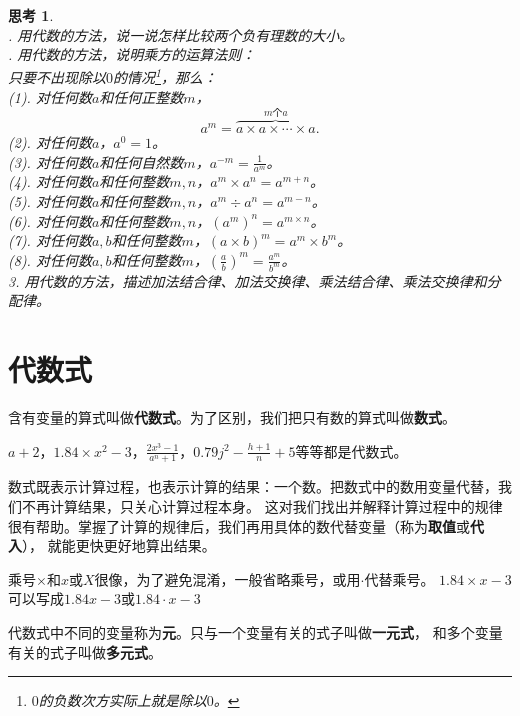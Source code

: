 \documentclass[12pt,UTF8]{ctexbook}
\newtheorem{sk}{思考}[section]
\begin{document}
\begin{sk}\label{sk:1-0-0}
    \mbox{}\\
    . 用代数的方法，说一说怎样比较两个负有理数的大小。\\
    . 用代数的方法，说明乘方的运算法则：\\
    \indent \indent 只要不出现除以$0$的情况\footnote{$0$的负数次方实际上就是除以$0$。}，那么：\\
    \indent \indent (1). 对任何数$a$和任何正整数$m$，
    $$a^m = \overbrace{a\times a \times \cdots \times a}^{m\text{个}a}.$$
    \indent \indent (2). 对任何数$a$，$a^0 = 1$。\\
    \indent \indent (3). 对任何数$a$和任何自然数$m$，$a^{-m} = \frac{1}{a^m}$。\\
    \indent \indent (4). 对任何数$a$和任何整数$m,n$，$a^m \times a^n = a^{m+n}$。\\
    \indent \indent (5). 对任何数$a$和任何整数$m,n$，$a^m \div a^n = a^{m-n}$。\\
    \indent \indent (6). 对任何数$a$和任何整数$m,n$，$\left(a^m\right)^n = a^{m\times n}$。\\
    \indent \indent (7). 对任何数$a,b$和任何整数$m$，$(a\times b)^m = a^m \times b^m$。\\
    \indent \indent (8). 对任何数$a,b$和任何整数$m$，$\left(\frac{a}{b}\right)^m = \frac{a^m}{b^m}$。\\
    3. 用代数的方法，描述加法结合律、加法交换律、乘法结合律、乘法交换律和分配律。
\end{sk}

\section{代数式}
含有变量的算式叫做\textbf{代数式}。为了区别，我们把只有数的算式叫做\textbf{数式}。

$a + 2$，$1.84\times x^2 - 3$，$\frac{2x^3 - 1}{a^n + 1}$，$0.79 j^2 - \frac{h+1}{n} + 5 $等等都是代数式。

数式既表示计算过程，也表示计算的结果：一个数。把数式中的数用变量代替，我们不再计算结果，只关心计算过程本身。
这对我们找出并解释计算过程中的规律很有帮助。掌握了计算的规律后，我们再用具体的数代替变量（称为\textbf{取值}或\textbf{代入}），
就能更快更好地算出结果。

乘号$\times$和$x$或$X$很像，为了避免混淆，一般省略乘号，或用$\cdot$代替乘号。
$1.84\times x - 3$可以写成$1.84 x - 3$或$1.84\cdot x - 3$

代数式中不同的变量称为\textbf{元}。只与一个变量有关的式子叫做\textbf{一元式}，
和多个变量有关的式子叫做\textbf{多元式}。
\end{document}
